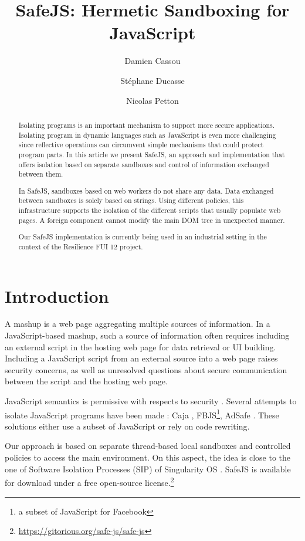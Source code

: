 \documentclass{article}
\newcommand{\js}{JavaScript\xspace}
\newcommand{\safejs}{SafeJS\xspace}
\newcommand{\dom}{DOM\xspace}
\begin{document}
\title{\safejs: Hermetic Sandboxing for \js}
\author{Damien Cassou \and St\'ephane Ducasse \and Nicolas Petton}
\date{}
\maketitle

\begin{abstract}
Isolating programs is an important mechanism to support more secure applications. Isolating program in dynamic languages such as \js is even more  challenging since reflective operations can circumvent simple mechanisms that could protect program parts. In this article we present \safejs, an approach and implementation that offers isolation based on separate sandboxes and control of information exchanged between them.

In \safejs, sandboxes based on web workers do not share any data. Data exchanged between sandboxes is solely based on strings. Using different policies, this infrastructure supports the isolation of the different scripts that usually populate web pages. A foreign component cannot modify the main \dom tree in unexpected manner.

Our \safejs implementation is currently being used in an industrial
setting in the context of the Resilience FUI 12 project.

\end{abstract}


\section{Introduction}

A mashup is a web page aggregating multiple sources of information. In
a \js-based mashup, such a source of information often requires
including an external script in the hosting web page for data
retrieval or UI building. Including a \js script from an external
source into a web page raises security concerns, as well as unresolved
questions about secure communication between the script and the
hosting web page.

\js semantics is permissive with respects to security
\cite{Maff09a,Guha10a,Rich11a}. Several attempts to isolate \js
programs have been made : Caja \cite{Mill08a}, FBJS\footnote{a subset
  of JavaScript for Facebook}, AdSafe \cite{Poli11a}. These solutions
either use a subset of \js or rely on code rewriting.

Our approach is based on separate thread-based local sandboxes and
controlled policies to access the main environment. On this aspect,
the idea is close to the one of Software Isolation Processes (SIP) of
Singularity OS \cite{Hunt07a}. \safejs is available for download under a free open-source
license.\footnote{\url{https://gitorious.org/safe-js/safe-js}}
\end{document}
